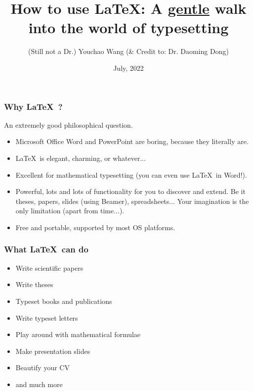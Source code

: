 \documentclass[11pt]{beamer}
\title{How to use \LaTeX\xspace : \small{A \underline{gentle} walk into the world of typesetting}}
\author{(Still not a Dr.) Youchao Wang (\& Credit to: Dr. Daoming Dong)}
\institute{CMMPE, Engineering, University of Cambridge}
\date{July, 2022}
\begin{document}
\begin{frame}
	\titlepage
\end{frame}

\begin{frame}
	\frametitle{Why \LaTeX\ ?}
	An extremely good philosophical question.
	
	\begin{itemize}
		\item Microsoft Office Word and PowerPoint are boring, because they literally are.
		\item \LaTeX\ is elegant, charming, or whatever...
		\item Excellent for mathematical typesetting (you can even use \LaTeX \ in Word!).
		\item Powerful, lots and lots of functionality for you to discover and extend. Be it theses, papers, slides (using Beamer), spreadsheets... Your imagination is the only limitation (apart from time...).
		\item Free and portable, supported by most OS platforms.
	\end{itemize}

\end{frame}

\begin{frame}
\frametitle{What \LaTeX \ can do}

\begin{itemize}
	\item Write scientific papers
	\item Write theses
	\item Typeset books and publications
	\item Write typeset letters
	\item Play around with mathematical formulae
	\item Make presentation slides
	\item Beautify your CV
	\item and much more
\end{itemize}

\end{frame}
\end{document}

